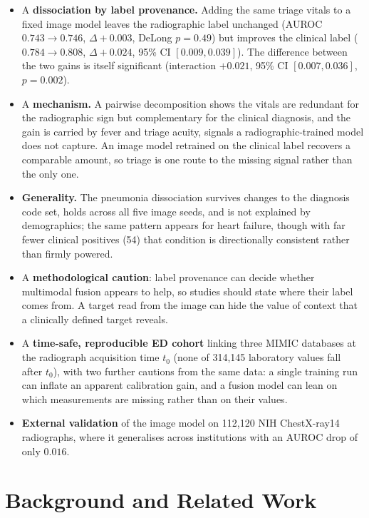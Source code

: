 \documentclass[twocolumn, final]{svjour3}
\begin{document}
\begin{itemize}
\item A \textbf{dissociation by label provenance.} Adding the same triage vitals to a
  fixed image model leaves the radiographic label unchanged (AUROC $0.743\rightarrow0.746$,
  $\Delta+0.003$, DeLong $p{=}0.49$) but improves the clinical label
  ($0.784\rightarrow0.808$, $\Delta+0.024$, 95\% CI $[0.009,0.039]$). The difference
  between the two gains is itself significant (interaction $+0.021$, 95\% CI
  $[0.007,0.036]$, $p{=}0.002$).
\item A \textbf{mechanism.} A pairwise decomposition shows the vitals are redundant for
  the radiographic sign but complementary for the clinical diagnosis, and the gain is
  carried by fever and triage acuity, signals a radiographic-trained model does not capture.
  An image model retrained on the clinical label recovers a comparable amount, so triage is
  one route to the missing signal rather than the only one.
\item \textbf{Generality.} The pneumonia dissociation survives changes to the diagnosis
  code set, holds across all five image seeds, and is not explained by demographics; the
  same pattern appears for heart failure, though with far fewer clinical positives (54) that
  condition is directionally consistent rather than firmly powered.
\item A \textbf{methodological caution}: label provenance can decide whether multimodal
  fusion appears to help, so studies should state where their label comes from. A target
  read from the image can hide the value of context that a clinically defined target reveals.
\item A \textbf{time-safe, reproducible ED cohort} linking three MIMIC databases at the
  radiograph acquisition time $t_0$ (none of 314{,}145 laboratory values fall after
  $t_0$), with two further cautions from the same data: a single training run can inflate
  an apparent calibration gain, and a fusion model can lean on which measurements are
  missing rather than on their values.
\item \textbf{External validation} of the image model on 112{,}120 NIH ChestX-ray14
  radiographs, where it generalises across institutions with an AUROC drop of only
  $0.016$.
\end{itemize}

\section{Background and Related Work}
\label{sec:background}
\end{document}
